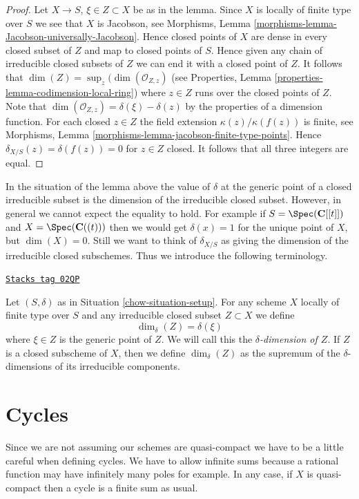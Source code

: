 \begin{proof}
Let $X \to S$, $\xi \in Z \subset X$ be as in the lemma.
Since $X$ is locally of finite type over $S$ we see that
$X$ is Jacobson, see
Morphisms, Lemma \ref{morphisms-lemma-Jacobson-universally-Jacobson}.
Hence closed points of $X$ are dense in every closed subset of $Z$
and map to closed points of $S$. Hence given any chain
of irreducible closed subsets of $Z$ we can end it with a closed point of $Z$.
It follows that $\dim(Z) = \sup_z(\dim(\mathcal{O}_{Z, z})$
(see Properties, Lemma \ref{properties-lemma-codimension-local-ring})
where $z \in Z$ runs over the closed points of $Z$.
Note that $\dim(\mathcal{O}_{Z, z}) = \delta(\xi) - \delta(z)$
by the properties of a dimension function.
For each closed $z \in Z$ the field extension
$\kappa(z)/\kappa(f(z))$ is finite, see Morphisms,
Lemma \ref{morphisms-lemma-jacobson-finite-type-points}.
Hence $\delta_{X/S}(z) = \delta(f(z)) = 0$ for $z \in Z$ closed.
It follows that all three integers are equal.
\end{proof}

In the situation of the lemma above the
value of $\delta$ at the generic point of a closed irreducible subset
is the dimension of the irreducible closed subset.
However, in general we cannot expect the equality to hold.
For example if $S = \Spec(\mathbf{C}[[t]])$ and
$X = \Spec(\mathbf{C}((t)))$ then we would get
$\delta(x) = 1$ for the unique point of $X$, but $\dim(X) = 0$.
Still we want to think of $\delta_{X/S}$ as giving the
dimension of the irreducible closed subschemes. Thus we introduce
the following terminology.

\begin{definition}
\label{chow-definition-delta-dimension}
\href{https://stacks.math.columbia.edu/tag/02QP}{\texttt{Stacks tag 02QP}}

Let $(S, \delta)$ as in Situation \ref{chow-situation-setup}.
For any scheme $X$ locally of finite type over $S$
and any irreducible closed subset $Z \subset X$ we define
$$
\dim_\delta(Z) = \delta(\xi)
$$
where $\xi \in Z$ is the generic point of $Z$.
We will call this the {\it $\delta$-dimension of $Z$}.
If $Z$ is a closed subscheme of $X$, then we define
$\dim_\delta(Z)$ as the supremum of the $\delta$-dimensions
of its irreducible components.
\end{definition}

\section{Cycles}
\label{chow-section-cycles}
Since we are not assuming our schemes are quasi-compact we have
to be a little careful when defining cycles. We have to allow
infinite sums because a rational function may have infinitely many
poles for example. In any case, if $X$ is quasi-compact then a
cycle is a finite sum as usual.

